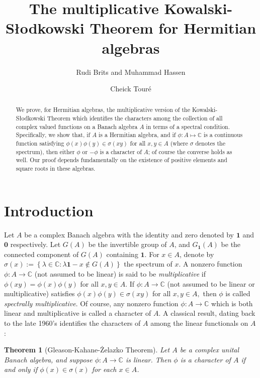 \documentclass{amsart}
\title{The multiplicative Kowalski-S\l{}odkowski Theorem for Hermitian algebras}
\author{Rudi Brits and Muhammad Hassen}
\author{ Cheick Tour\'e}
\newtheorem{theorem}{Theorem}[section]
\theoremstyle{definition}
\theoremstyle{remark}
\begin{document}
	\begin{abstract}
		We prove, for Hermitian algebras, the multiplicative version of the Kowalski-S\l{}odkowski Theorem which identifies the characters among the collection of all complex valued functions on a Banach algebra $A$ in terms of a spectral condition. Specifically, we show that, if $A$ is a Hermitian algebra, and if $\phi:A\mapsto\mathbb C$ is a continuous function satisfying  $\phi(x)\phi(y) \in \sigma(xy)$ for all $x,y\in A$ (where $\sigma$ denotes the spectrum), then either  $\phi$ or $-\phi$ is a character of $A$; of course the converse holds as well. Our proof depends fundamentally on the existence of positive elements and square roots in these algebras. 
	\end{abstract}
	\maketitle
	
	\section{Introduction}
	
	 Let $A$ be a complex Banach algebra with the identity and zero denoted by $\mathbf 1$ and $\mathbf 0$ respectively. Let $G(A)$ be the invertible group of $A$, and $G_{\mathbf 1}(A)$ be the connected component of $G(A)$ containing $\mathbf 1$.  For $x\in A$, denote by $\sigma(x):=\left\{\lambda\in\mathbb C:\lambda\mathbf 1-x\not\in G(A)\right\}$ the spectrum of $x$.  A nonzero function $\phi:A\to\mathbb C$ (not assumed to be linear) is said to be \emph{multiplicative} if $\phi(xy)=\phi(x)\phi(y)$ for all $x,y\in A$. If $\phi:A\to\mathbb C$ (not assumed to be linear or multiplicative) satisfies
	$\phi(x)\phi(y) \in \sigma(xy)$ for all $x,y\in A,$ then $\phi$ is called \emph{spectrally multiplicative}.  Of course, any nonzero function $\phi:A\to\mathbb C$ which is both linear and multiplicative is called a character of $A$. A classical result, dating back to the late 1960's identifies the characters of $A$ among the linear functionals on $A$: 
	
	\begin{theorem}[Gleason-Kahane-\.{Z}elazko Theorem]\label{origin}
		Let $A$ be a complex unital Banach algebra, and suppose $\phi:A\rightarrow\mathbb C$ is linear. Then $\phi$  is a character of $A$ if and only if $\phi(x)\in\sigma(x)$ for each $x\in A$. 
	\end{theorem}
	
\end{document}
